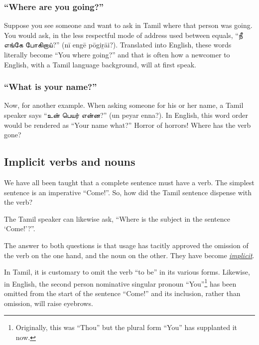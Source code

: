 \documentclass[
  11pt,
  british,
  a4paper,
]{article}
\begin{document}
\hypertarget{where-are-you-going}{%
\subsubsection{``Where are you going?''}\label{where-are-you-going}}

Suppose you see someone and want to ask in Tamil where that person was
going. You would ask, in the less respectful mode of address used
between equals, ``நீ எங்கே போகிறாய்?'' (nī engē pōgiṟāi?). Translated
into English, these words literally become ``You where going?'' and that
is often how a newcomer to English, with a Tamil language background,
will at first speak.

\hypertarget{what-is-your-name}{%
\subsubsection{``What is your name?''}\label{what-is-your-name}}

Now, for another example. When asking someone for his or her name, a
Tamil speaker says ``உன் பெயர் என்ன?'' (un peyar enna?). In English,
this word order would be rendered as ``Your name what?'' Horror of
horrors! Where has the verb gone?

\hypertarget{implicit-verbs-and-nouns}{%
\subsection{Implicit verbs and nouns}\label{implicit-verbs-and-nouns}}

We have all been taught that a complete sentence must have a verb. The
simplest sentence is an imperative ``Come!''. So, how did the Tamil
sentence dispense with the verb?

The Tamil speaker can likewise ask, ``Where is the subject in the
sentence `Come!'?''.

The answer to both questions is that usage has tacitly approved the
omission of the verb on the one hand, and the noun on the other. They
have become
\href{https://www.thefreedictionary.com/implicit}{\emph{implicit}}.

In Tamil, it is customary to omit the verb ``to be'' in its various
forms. Likewise, in English, the second person nominative singular
pronoun ``You''\footnote{Originally, this was ``Thou'' but the plural
  form ``You'' has supplanted it now.} has been omitted from the start
of the sentence ``Come!'' and its inclusion, rather than omission, will
raise eyebrows.
\end{document}
